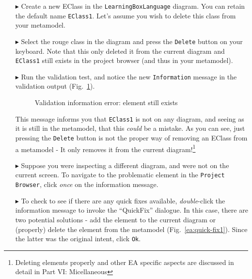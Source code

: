 \begin{enumerate}
\item[$\blacktriangleright$] Create a new EClass in the \texttt{Learning\-Box\-Language} diagram. You can retain the default name \texttt{EClass1}. Let's
assume you wish to delete this class from your metamodel.

\item[$\blacktriangleright$] Select the rouge class in the diagram and press the \texttt{Delete} button on your keyboard. Note that this only deleted it from
the current diagram and \texttt{EClass1} still exists in the project browser (and thus in your metamodel).

\item[$\blacktriangleright$] Run the validation test, and notice the new \texttt{Information} message in the validation output
(Fig.~\ref{ea:validation_information}).

\begin{figure}[htbp]
	\centering
	\caption{Validation information error: element still exists}
	\label{ea:validation_information}
\end{figure}

This message informs you that \texttt{EClass1} is not on any diagram, and seeing as it is still in the metamodel, that this \emph{could} be a mistake. As you
can see, just pressing the \texttt{Delete} button is not the proper way of removing an EClass from a metamodel - It only removes it from the current
diagram!\footnote{Deleting elements properly and other EA specific aspects are discussed in detail in Part VI: Micellaneous}

\item[$\blacktriangleright$] Suppose you were inspecting a different diagram, and were not on the current screen. To navigate to the problematic element in the
\texttt{Project Browser}, click \emph{once} on the information message.

\newpage

\item[$\blacktriangleright$] To check to see if there are any quick fixes available, \emph{double}-click the information message to invoke the ``QuickFix''
dialogue. In this case, there are two potential solutions - add the element to the current diagram or (properly) delete the element from the metamodel
(Fig.~\ref{ea:quick-fix1}). Since the latter was the original intent, click \texttt{Ok}.


\end{enumerate}
